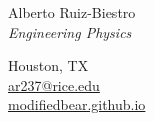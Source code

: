 \documentclass[letterpaper,11pt,notitlepage]{article}
\newcommand{\hmargin}{1.7cm} %
\begin{document}
\pagestyle{fancy}
\begin{minipage}[t][\hmargin][c]{0.60\textwidth}
	
    {\Huge{Alberto Ruiz-Biestro} }\\[0.8em]
	{\color{darkgray}\itshape\Large Engineering Physics}
	
\end{minipage}
\hfill
\begin{minipage}[t][\hmargin][c]{0.35\textwidth}
\raggedleft\color{darkgray}
Houston, TX\\
\href{mailto:ar237@rice.edu}{ar237@rice.edu}\\
\href{https://modifiedbear.github.io/}{modifiedbear.github.io}\\
\end{minipage}

\vspace{0.5in}
\end{document}
